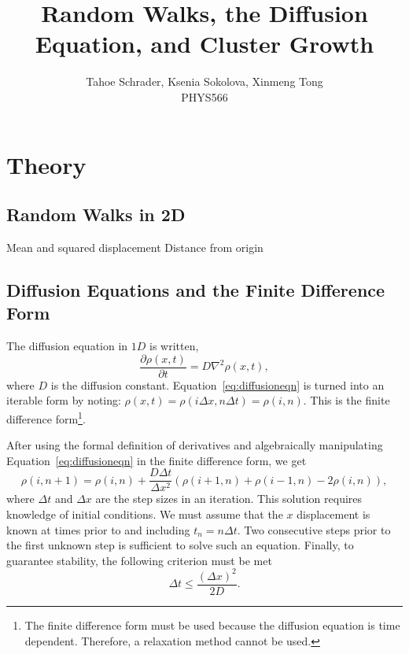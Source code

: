 \documentclass[10pt]{article}
\title{Random Walks, the Diffusion Equation, and Cluster Growth}
\author{Tahoe Schrader, Ksenia Sokolova, Xinmeng Tong \\PHYS566}
\date{}
\begin{document}
\maketitle


\section{Theory}
\label{sec:theory}

\subsection{Random Walks in 2D}
Mean and squared displacement
Distance from origin

\subsection{Diffusion Equations and the Finite Difference Form}
\label{sec:diffusionequation}
The diffusion equation in $1D$ is written,
\begin{equation}
  \label{eq:diffusioneqn}
  \frac{\partial\rho(x,t)}{\partial t} = D\nabla^2\rho(x,t),
\end{equation}
where $D$ is the diffusion constant. Equation~\ref{eq:diffusioneqn} is turned into an iterable form by noting: $\rho(x,t) = \rho(i\Delta x, n\Delta t) = \rho(i,n)$. This is the finite difference form\footnote{The finite difference form must be used because the diffusion equation is time dependent. Therefore, a relaxation method cannot be used.}.

After using the formal definition of derivatives and algebraically manipulating Equation~\ref{eq:diffusioneqn} in the finite difference form, we get
\begin{equation}
  \label{eq:diffusioneqn-iterable}
  \rho(i,n+1) = \rho(i,n) + \frac{D\Delta t}{\Delta x^2}\left(\rho(i+1,n) + \rho(i-1,n) - 2\rho(i,n)\right),
\end{equation}
where $\Delta t$ and $\Delta x$ are the step sizes in an iteration. This solution requires knowledge of initial conditions. We must assume that the $x$ displacement is known at times prior to and including $t_n = n\Delta t$. Two consecutive steps prior to the first unknown step is sufficient to solve such an equation. Finally, to guarantee stability, the following criterion must be met
\begin{equation}
  \label{eq:stabilitycriterion}
  \Delta t \leq \frac{(\Delta x)^2}{2D}.
\end{equation}
\end{document}
